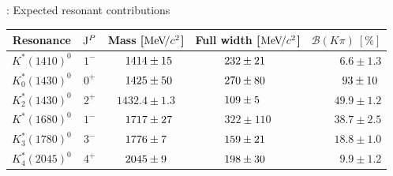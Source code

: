\documentclass[aspectratio=1610]{beamer}
\begin{document}
\begin{frame}{\BdToKpimm: Expected resonant contributions}

\begin{center}
\begin{tabular}{c|c|c|c|r}
Resonance & ${\rm J}^{P}$ & Mass [$\mathrm{Me\kern -0.1em V\!/}c^2$] & Full width [$\mathrm{Me\kern -0.1em V\!/}c^2$]  & $\mathcal{B}(K\pi)~[\%]$ \\
\hline
$K^\ast(1410)^0$ & $1^{-}$& $\hphantom{0.}1414 \pm 15\hphantom{.}$& $232 \pm 21\hphantom{0}$  & $6.6 \pm 1.3$ \\
$K^\ast_0(1430)^0$ & $0^{+}$ & $\hphantom{0.}1425 \pm 50\hphantom{.}$ & $270 \pm 80\hphantom{0}$ & $\hphantom{.}93 \pm 10\hphantom{.}$ \\
$K^\ast_2(1430)^0$ & $2^{+}$ & $1432.4\pm 1.3$ & $109 \pm 5\hphantom{00}$ & $49.9 \pm 1.2$ \\
$K^\ast(1680)^0$ & $1^{-}$ & $\hphantom{0.}1717 \pm 27\hphantom{.}$ & $322 \pm 110$ & $38.7 \pm 2.5$ \\
$K^\ast_3(1780)^0$ & $3^{-}$ & $\hphantom{0.}1776 \pm 7\hphantom{0.}$ & $159 \pm 21\hphantom{0}$ & $18.8 \pm 1.0$ \\
$K^\ast_4(2045)^0$ & $4^{+}$ & $\hphantom{0.}2045 \pm 9\hphantom{0.}$ & $198 \pm 30\hphantom{0}$ & $9.9 \pm 1.2$ \\
\end{tabular}
\end{center}

\end{frame}
\end{document}
